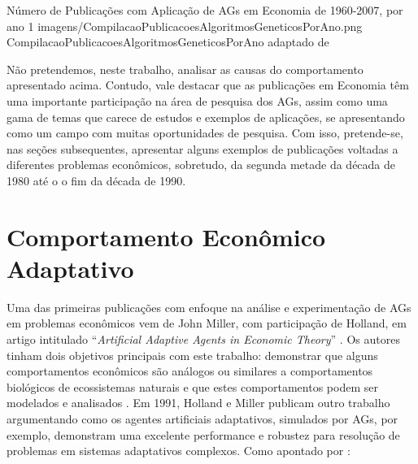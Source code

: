 \figura
	{Número de Publicações com Aplicação de AGs em Economia de 1960-2007, por ano}
	{1}
	{imagens/CompilacaoPublicacoesAlgoritmosGeneticosPorAno.png}
	{CompilacaoPublicacoesAlgoritmosGeneticosPorAno}
	{adaptado de }
	
Não pretendemos, neste trabalho, analisar as causas do comportamento apresentado acima. Contudo, vale destacar que as publicações em Economia têm uma importante participação na área de pesquisa dos AGs, assim como uma gama de temas que carece de estudos e exemplos de aplicações, se apresentando como um campo com muitas oportunidades de pesquisa. Com isso, pretende-se, nas seções subsequentes, apresentar alguns exemplos de publicações voltadas a diferentes problemas econômicos, sobretudo, da segunda metade da década de 1980 até o o fim da década de 1990.

\section{Comportamento Econômico Adaptativo}

Uma das primeiras publicações com enfoque na análise e experimentação de AGs em problemas econômicos vem de John Miller, com participação de Holland, em artigo intitulado \enquote{\textit{Artificial Adaptive Agents in Economic Theory}} \citep{miller_1986}. Os autores tinham dois objetivos principais com este trabalho: demonstrar que alguns comportamentos econômicos são análogos ou similares a comportamentos biológicos de ecossistemas naturais e que estes comportamentos podem ser modelados e analisados . Em 1991, Holland e Miller publicam outro trabalho argumentando como os agentes artificiais adaptativos, simulados por AGs, por exemplo, demonstram uma excelente performance e robustez para resolução de problemas em sistemas adaptativos complexos. Como apontado por :

